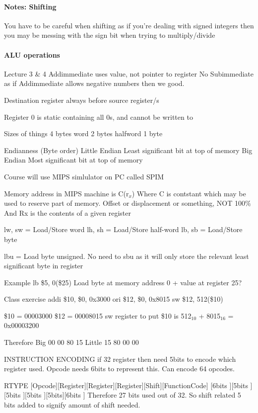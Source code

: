 \documentclass{article}
\newcommand\tab[1][0.5cm]{\hspace*{#1}}
\begin{document}
		\paragraph{Notes: Shifting} You have to be careful when shifting as if you're dealing with signed integers then you may be messing with the sign bit when trying to multiply/divide	

		\paragraph{\tab ALU operations}


Lecture 3 \& 4
	Addimmediate uses value, not pointer to register
	No Subimmediate as if Addimmediate allows negative numbers then we good.

	Destination register always before source register/s

	Register 0 is static containing all 0s, and cannot be written to

	Sizes of things
		4 bytes		word
		2 bytes		halfword
		1 byte		

	Endianness (Byte order)
		Little Endian	Least significant bit at top of memory
		Big Endian		Most significant bit at top of memory

	Course will use MIPS simlulator on PC called SPIM

	Memory address in MIPS machine is C(r$_x$)
		Where C is contstant which may be used to reserve part of memory. Offset or displacement or something, NOT 100\%
		And Rx is the contents of a given register

	lw, sw = Load/Store word
	lh, sh = Load/Store half-word
	lb, sb = Load/Store byte

	lbu = Load byte unsigned. No need to sbu as it will only store the relevant least significant byte in register

	Example
		lb \$5, 0(\$25)
		Load byte at memory address 0 + value at register 25?

	Class exercise
		addi \$10, \$0, 0x3000
		ori \$12, \$0, 0x8015
		sw \$12, 512(\$10)

		\$10 = 00003000
		\$12 = 00008015
		sw register to put \$10 is 512$_{10}$ + 8015$_{16}$ = 0x00003200

		Therefore Big 00 00 80 15
		Little 15 80 00 00

	INSTRUCTION ENCODING
		if 32 register then need 5bits to encode which register used.
		Opcode needs 6bits to represent this. Can encode 64 opcodes.

		RTYPE
		[Opcode][Register][Register][Register][Shift][FunctionCode]
		[6bits ][5bits   ][5bits   ][5bits   ][5bits][6bits       ]
		Therefore 27 bits used out of 32. So shift related 5 bits added to signify amount of shift needed.
\end{document}

